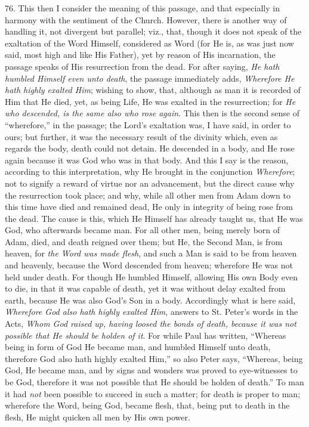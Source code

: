 76. This then I consider the
meaning of this passage, and that especially in harmony with the
sentiment of the Church. However, there is another way of handling it,
not divergent but parallel; viz., that, though it does not speak of
the exaltation of the Word Himself, considered as Word (for He is, as
was just now said, most high and like His Father), yet by reason of
His incarnation, the passage speaks of His resurrection from the dead.
For after saying, \emph{He hath humbled Himself even unto death}, the
passage immediately adds, \emph{Wherefore He hath highly exalted Him};
wishing to show, that, although as man it is recorded of Him that He
died, yet, as being Life, He was exalted in the resurrection; for \emph{He
who descended, is the same also who rose again}. This then is the
second sense of ``wherefore,'' in the passage; the Lord's exaltation
was, I have said, in order to ours; but further, it was the necessary
result of the divinity which, even as regards the body, death could
not detain. He descended in a body, and He rose again because it was
God who was in that body. And this I say is the reason,
according to this interpretation, why He brought in the conjunction \emph{Wherefore};
not to signify a reward of virtue nor an advancement, but the direct
cause why the resurrection took place; and why, while all other men
from Adam down to this time have died and remained dead, He only in
integrity of being rose from the dead. The cause is this, which He
Himself has already taught us, that He was God, who afterwards became
man. For all other men, being merely born of Adam, died, and death
reigned over them; but He, the Second Man, is from heaven, for \emph{the
Word was made flesh}, and such a Man is said to be from heaven and
heavenly, because the Word descended from heaven; wherefore He was not
held under death. For though He humbled Himself, allowing His own Body
even to die, in that it was capable of death, yet it was without delay
exalted from earth, because He was also God's Son in a body.
Accordingly what is here said, \emph{Wherefore God also hath highly
exalted Him}, answers to St. Peter's words in the Acts, \emph{Whom God
raised up, having loosed the bonds of death, because it was not
possible that He should be holden of it}. For while Paul has
written, ``Whereas being in form of God He became man, and humbled
Himself unto death, therefore God also hath highly exalted Him,'' so
also Peter says, ``Whereas, being God, He became man, and by signs and
wonders was proved to eye-witnesses to be God, therefore it was not
possible that He should be holden of death.'' To man it had \emph{not}
been possible to succeed in such a matter; for death is proper to man;
wherefore the Word, being God, became flesh, that, being put to death
in the flesh, He might quicken all men by His own power.

